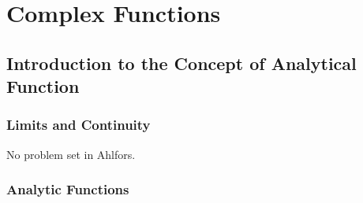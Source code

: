 \chapter{Complex Functions}

\section{Introduction to the Concept of Analytical Function}

\subsection{Limits and Continuity}
No problem set in Ahlfors.

\subsection{Analytic Functions}

